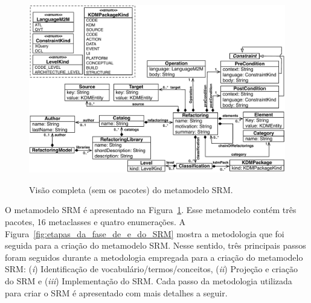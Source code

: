 \begin{figure}[h]
	\centering
		\caption{Visão completa (sem os pacotes) do metamodelo SRM.}
	\includegraphics[scale=0.65]{images/NewSRM}
	\label{fig:meta_modelo_SRM}
	\fautor
\end{figure}

O metamodelo SRM é apresentado na Figura~\ref{fig:meta_modelo_SRM}. Esse metamodelo contém três pacotes, 16 metaclasses e quatro enumerações. A Figura~\ref{fig:etapas_da_fase_de_e_do_SRM} mostra a metodologia que foi seguida para a criação do metamodelo SRM. Nesse sentido, três principais passos foram seguidos durante a metodologia empregada para a criação do metamodelo SRM: (\textit{i})  Identificação de vocabulário/termos/conceitos, (\textit{ii}) Projeção e criação do SRM e (\textit{iii}) Implementação do SRM. Cada passo da metodologia utilizada para criar o SRM é apresentado com mais detalhes a seguir.




